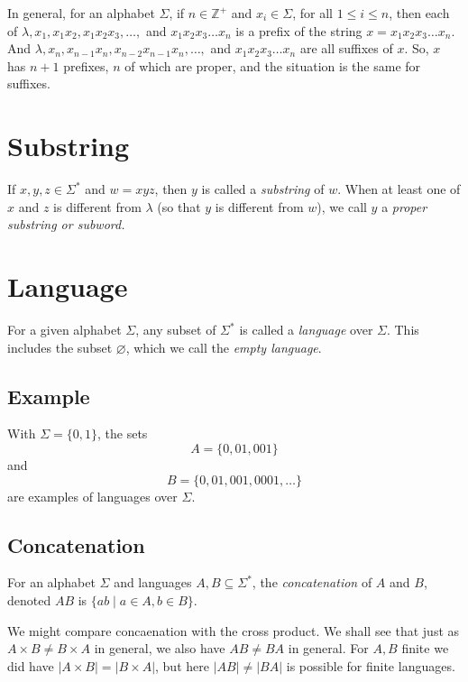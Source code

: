 \documentclass[11pt]{article}
\let\emptyset\varnothing
\begin{document}
    \vspace{1em}

    In general, for an alphabet \(\Sigma\), if \(n \in \mathbb{Z}^+\) and \(x_i \in \Sigma\), for all \( 1 \leq i \leq n \), then each of \(\lambda, x_1, x_1x_2, x_1 x_2 x_3, \dots,\) and \(x_1 x_2 x_3 \dots x_n\) is a prefix of the string \( x = x_1 x_2 x_3 \dots x_n \). And \(\lambda, x_n, x_{n-1} x_n, x_{n-2} x_{n-1} x_n, \dots,\) and \( x_1 x_2 x_3 \dots x_n \) are all suffixes of $x$. So, $x$ has \(n+1\) prefixes, $n$ of which are proper, and the situation is the same for suffixes.

    \section{Substring}

    If \(x,y,z \in \Sigma^*\) and \(w = xyz\), then $y$ is called a \emph{substring} of $w$. When at least one of $x$ and $z$ is different from \(\lambda\) (so that $y$ is different from $w$), we call $y$ a \emph{proper substring or subword.}

    \section{Language}

    For a given alphabet \(\Sigma\), any subset of \( \Sigma^* \) is called a \emph{language} over \(\Sigma\). This includes the subset \(\emptyset\), which we call the \emph{empty language}.

    \subsection{Example}

    With \( \Sigma = \{0,1\} \), the sets \[A = \{0,01,001\}\] and \[ B = \{0,01,001,0001, \dots\} \] are examples of languages over \(\Sigma\).

    \subsection{Concatenation}

    For an alphabet \(\Sigma\) and languages \(A,B \subseteq \Sigma^*\), the \emph{concatenation} of $A$ and $B$, denoted \(AB\) is \(\{ab \mid a \in A, b \in B\}\).

    \vspace{1em}

    We might compare concaenation with the cross product. We shall see that just as \(A \times B \neq B \times A\) in general, we also have \(AB \neq BA\) in general. For \(A,B \) finite we did have \(|A \times B| = |B \times A|\), but here \(|AB| \neq |BA|\) is possible for finite languages.
\end{document}
